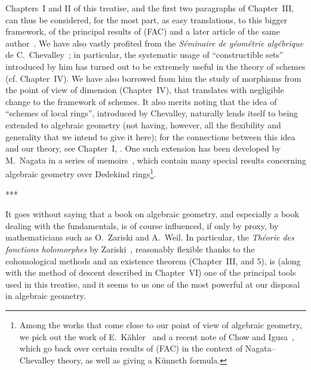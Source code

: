 \documentclass[openany,oneside]{amsbook}
\theoremstyle{ega-env-style}
\theoremstyle{ega-thm-env-style}
\theoremstyle{ega-defn-env-style}
\newcommand{\oldpage}[2][]{{\marginnote{\normalfont{\textbf{#1}~|~#2}}}\ignorespaces}
\def\sectionbreak{\begin{center}***\end{center}}
\begin{document}
Chapters~I and II of this treatise, and the first two paragraphs of Chapter~III, can thus be considered, for the most part, as easy translations, to this bigger framework, of the principal results of (FAC) and a later article of the same author~\cite{I-15}.
We have also vastly profited from the \emph{S\'eminaire de g\'eom\'etrie alg\'ebrique} de C.~Chevalley~\cite{I-1};
in particular, the systematic usage of ``constructible sets'' introduced by him has turned out to be extremely useful in the theory of schemes (cf. Chapter~IV).
We have also borrowed from him the study of morphisms from
\oldpage[I]{8}
the point of view of dimension (Chapter~IV), that translates with negligible change to the framework of schemes.
It also merits noting that the idea of ``schemes of local rings'', introduced by Chevalley, naturally lends itself to being extended to algebraic geometry (not having, however, all the flexibility and generality that we intend to give it here);
for the connections between this idea and our theory, see Chapter~I, .
One such extension has been developed by M.~Nagata in a series of memoirs~\cite{I-9}, which contain many special results concerning algebraic geometry over Dedekind rings\footnote{Among the works that come close to our point of view of algebraic geometry, we pick out the work of E.~K\"ahler~\cite{I-22} and a recent note of Chow and Igusa~\cite{I-3}, which go back over certain results of (FAC) in the context of Nagata--Chevalley theory, as well as giving a K\"unneth formula.}.

\sectionbreak

It goes without saying that a book on algebraic geometry, and especially a book dealing with the fundamentals, is of course influenced, if only by proxy, by mathematicians such as O.~Zariski and A.~Weil.
In particular, the \emph{Th\'eorie des fonctions holomorphes} by Zariski~\cite{I-20}, reasonably flexible thanks to the cohomological methods and an existence theorem (Chapter~III, \textsection{} and 5), is (along with the method of descent described in Chapter~VI) one of the principal tools used in this treatise, and it seems to us one of the most powerful at our disposal in algebraic geometry.
\end{document}
